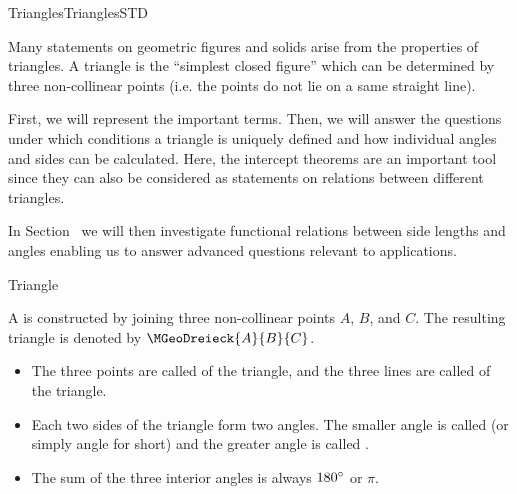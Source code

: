\begin{MXContent}{Triangles}{Triangles}{STD}

Many statements on geometric figures and solids arise from the properties of 
triangles. A triangle is the ``simplest closed figure'' which can be determined by 
three non-collinear points (i.e. the points do not lie on a same straight line).



First, we will represent the important terms. Then, we will answer the questions
under which conditions a triangle is uniquely defined and how individual 
angles and sides can be calculated. Here, the intercept theorems are an important tool 
since they can also be considered as statements on relations between different triangles.

In Section~ we will then investigate functional relations 
between side lengths and angles enabling us to answer advanced questions 
relevant to applications.

\begin{MXInfo}{Triangle}%

A  is constructed by joining three non-collinear points $A$, $B$, and $C$. 
The resulting triangle is denoted by $\MGeoDreieck{A}{B}{C}$.

\begin{itemize}
 \item The three points are called  of the triangle, and the 
three lines are called  of the triangle.
    
 \item Each two sides of the triangle form two angles. The smaller angle is called 
 (or simply angle for short) and the greater 
angle is called .
 
 \item The sum of the three interior angles is always $180^{\circ}$ or $\pi$.
\end{itemize}
\end{MXInfo}


\end{MXContent}
